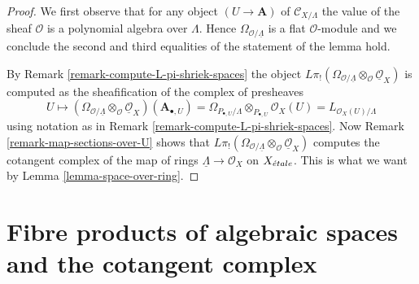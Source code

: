 \begin{proof}
We first observe that for any object $(U \to \mathbf{A})$ of
$\mathcal{C}_{X/\Lambda}$
the value of the sheaf $\mathcal{O}$ is a polynomial algebra over $\Lambda$.
Hence $\Omega_{\mathcal{O}/\underline{\Lambda}}$ is a flat $\mathcal{O}$-module
and we conclude the second and third equalities of the statement of the
lemma hold.

\medskip\noindent
By Remark \ref{remark-compute-L-pi-shriek-spaces} the object
$L\pi_!(\Omega_{\mathcal{O}/\underline{\Lambda}}
\otimes_\mathcal{O} \underline{\mathcal{O}}_X)$
is computed as the sheafification of the complex of presheaves
$$
U \mapsto
\left(\Omega_{\mathcal{O}/\underline{\Lambda}}
\otimes_\mathcal{O} \underline{\mathcal{O}}_X\right)(\mathbf{A}_{\bullet, U})
=
\Omega_{P_{\bullet, U}/\Lambda} \otimes_{P_{\bullet, U}} \mathcal{O}_X(U) =
L_{\mathcal{O}_X(U)/\Lambda}
$$
using notation as in Remark \ref{remark-compute-L-pi-shriek-spaces}.
Now Remark \ref{remark-map-sections-over-U} shows that
$L\pi_!(\Omega_{\mathcal{O}/\underline{\Lambda}}
\otimes_\mathcal{O} \underline{\mathcal{O}}_X)$
computes the cotangent complex of the map of rings
$\underline{\Lambda} \to \mathcal{O}_X$ on $X_{\acute{e}tale}$.
This is what we want by Lemma \ref{lemma-space-over-ring}.
\end{proof}






\section{Fibre products of algebraic spaces and the cotangent complex}
\label{section-fibre-product}

